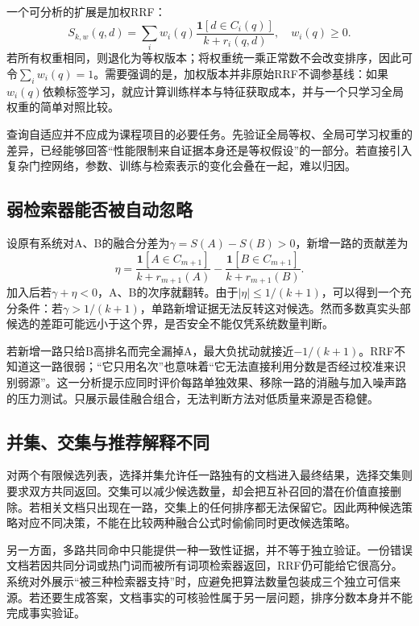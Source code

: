 \documentclass[sigconf,nonacm]{acmart}
\begin{document}
一个可分析的扩展是加权RRF：
\begin{equation}
 S_{k,w}(q,d)=\sum_i w_i(q)\frac{\mathbf1[d\in C_i(q)]}{k+r_i(q,d)},
 \quad w_i(q)\geq0.
\end{equation}
若所有权重相同，则退化为等权版本；将权重统一乘正常数不会改变排序，因此可令$\sum_iw_i(q)=1$。需要强调的是，加权版本并非原始RRF不调参基线：如果$w_i(q)$依赖标签学习，就应计算训练样本与特征获取成本，并与一个只学习全局权重的简单对照比较。

查询自适应并不应成为课程项目的必要任务。先验证全局等权、全局可学习权重的差异，已经能够回答“性能限制来自证据本身还是等权假设”的一部分。若直接引入复杂门控网络，参数、训练与检索表示的变化会叠在一起，难以归因。

\subsection{弱检索器能否被自动忽略}
设原有系统对A、B的融合分差为$\gamma=S(A)-S(B)>0$，新增一路的贡献差为
\begin{equation}
 \eta=\frac{\mathbf1[A\in C_{m+1}]}{k+r_{m+1}(A)}
 -\frac{\mathbf1[B\in C_{m+1}]}{k+r_{m+1}(B)}.
\end{equation}
加入后若$\gamma+\eta<0$，A、B的次序就翻转。由于$|\eta|\leq1/(k+1)$，可以得到一个充分条件：若$\gamma>1/(k+1)$，单路新增证据无法反转这对候选。然而多数真实头部候选的差距可能远小于这个界，是否安全不能仅凭系统数量判断。

若新增一路只给B高排名而完全漏掉A，最大负扰动就接近$-1/(k+1)$。RRF不知道这一路很弱；“它只用名次”也意味着“它无法直接利用分数是否经过校准来识别弱源”。这一分析提示应同时评价每路单独效果、移除一路的消融与加入噪声路的压力测试。只展示最佳融合组合，无法判断方法对低质量来源是否稳健。

\subsection{并集、交集与推荐解释不同}
对两个有限候选列表，选择并集允许任一路独有的文档进入最终结果，选择交集则要求双方共同返回。交集可以减少候选数量，却会把互补召回的潜在价值直接删除。若相关文档只出现在一路，交集上的任何排序都无法保留它。因此两种候选策略对应不同决策，不能在比较两种融合公式时偷偷同时更改候选策略。

另一方面，多路共同命中只能提供一种一致性证据，并不等于独立验证。一份错误文档若因共同分词或热门词而被所有词项检索器返回，RRF仍可能给它很高分。系统对外展示“被三种检索器支持”时，应避免把算法数量包装成三个独立可信来源。若还要生成答案，文档事实的可核验性属于另一层问题，排序分数本身并不能完成事实验证。
\end{document}
